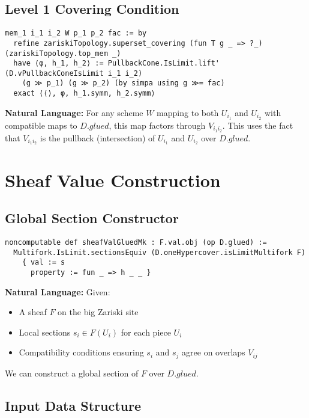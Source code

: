 \documentclass{article}
\theoremstyle{definition}
\begin{document}
\subsection{Level 1 Covering Condition}

\begin{lstlisting}
mem_1 i_1 i_2 W p_1 p_2 fac := by
  refine zariskiTopology.superset_covering (fun T g _ => ?_) (zariskiTopology.top_mem _)
  have ⟨φ, h_1, h_2⟩ := PullbackCone.IsLimit.lift' (D.vPullbackConeIsLimit i_1 i_2)
    (g ≫ p_1) (g ≫ p_2) (by simpa using g ≫= fac)
  exact ⟨⟨⟩, φ, h_1.symm, h_2.symm⟩
\end{lstlisting}

\textbf{Natural Language:} For any scheme $W$ mapping to both $U_{i_1}$ and $U_{i_2}$ with compatible maps to $D.glued$, this map factors through $V_{i_1 i_2}$. This uses the fact that $V_{i_1 i_2}$ is the pullback (intersection) of $U_{i_1}$ and $U_{i_2}$ over $D.glued$.

\section{Sheaf Value Construction}

\subsection{Global Section Constructor}

\begin{lstlisting}
noncomputable def sheafValGluedMk : F.val.obj (op D.glued) :=
  Multifork.IsLimit.sectionsEquiv (D.oneHypercover.isLimitMultifork F)
    { val := s
      property := fun _ => h _ _ }
\end{lstlisting}

\textbf{Natural Language:} Given:
\begin{itemize}
\item A sheaf $F$ on the big Zariski site
\item Local sections $s_i \in F(U_i)$ for each piece $U_i$
\item Compatibility conditions ensuring $s_i$ and $s_j$ agree on overlaps $V_{ij}$
\end{itemize}
We can construct a global section of $F$ over $D.glued$.

\subsection{Input Data Structure}
\end{document}
